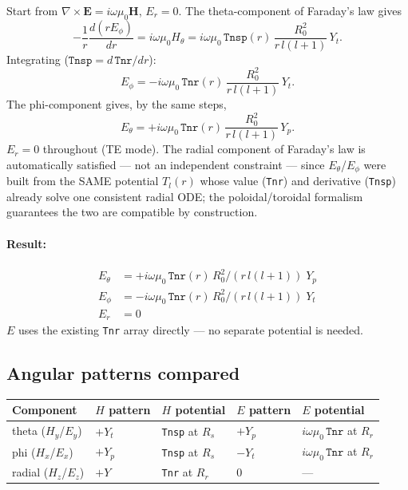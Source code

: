\documentclass[11pt]{article}
\begin{document}
Start from $\nabla\times\mathbf E = i\omega\mu_0\mathbf H$, $E_r=0$. The theta-component of
Faraday's law gives
\begin{equation}
-\frac{1}{r}\frac{d(rE_\phi)}{dr} = i\omega\mu_0 H_\theta
= i\omega\mu_0\,\mathtt{Tnsp}(r)\,\frac{R_0^2}{r\,l(l{+}1)}\,Y_t .
\end{equation}
Integrating ($\mathtt{Tnsp}=d\,\mathtt{Tnr}/dr$):
\begin{equation}
E_\phi = -i\omega\mu_0\,\mathtt{Tnr}(r)\,\frac{R_0^2}{r\,l(l{+}1)}\,Y_t .
\end{equation}
The phi-component gives, by the same steps,
\begin{equation}
E_\theta = +i\omega\mu_0\,\mathtt{Tnr}(r)\,\frac{R_0^2}{r\,l(l{+}1)}\,Y_p .
\end{equation}
$E_r=0$ throughout (TE mode). The radial component of Faraday's law is automatically satisfied
--- not an independent constraint --- since $E_\theta$/$E_\phi$ were built from the SAME potential
$T_l(r)$ whose value (\texttt{Tnr}) and derivative (\texttt{Tnsp}) already solve one consistent
radial ODE; the poloidal/toroidal formalism guarantees the two are compatible by construction.

\paragraph{Result:}
\begin{align}
E_\theta &= +i\omega\mu_0\,\mathtt{Tnr}(r)\,R_0^2/(r\,l(l{+}1))\;Y_p \\
E_\phi   &= -i\omega\mu_0\,\mathtt{Tnr}(r)\,R_0^2/(r\,l(l{+}1))\;Y_t \\
E_r      &= 0
\end{align}
$E$ uses the existing \texttt{Tnr} array directly --- no separate potential is needed.

\subsection*{Angular patterns compared}

\begin{table}[h]
\centering
\begin{tabular}{lllll}
\toprule
Component & $H$ pattern & $H$ potential & $E$ pattern & $E$ potential \\
\midrule
theta ($H_y$/$E_y$) & $+Y_t$ & \texttt{Tnsp} at $R_s$ & $+Y_p$ & $i\omega\mu_0\,\mathtt{Tnr}$ at $R_r$ \\
phi ($H_x$/$E_x$)   & $+Y_p$ & \texttt{Tnsp} at $R_s$ & $-Y_t$ & $i\omega\mu_0\,\mathtt{Tnr}$ at $R_r$ \\
radial ($H_z$/$E_z$) & $+Y$  & \texttt{Tnr} at $R_r$   & $0$    & --- \\
\bottomrule
\end{tabular}
\end{table}
\end{document}
